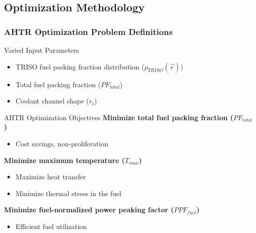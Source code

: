 \subsection{Optimization Methodology}
\begin{frame}
    \frametitle{AHTR Optimization Problem Definitions}
    \begin{block}{Varied Input Parameters}
        \begin{itemize}
            \item TRISO fuel packing fraction distribution ($\rho_{TRISO}(\vec{r})$)
            \item Total fuel packing fraction ($PF_{total}$)
            \item Coolant channel shape ($r_i$)
        \end{itemize}
    \end{block}
    \begin{block}{AHTR Optimization Objectives}
     \textbf{Minimize total fuel packing fraction ($PF_{total}$)}
     \begin{itemize}
        \item Cost savings, non-proliferation 
     \end{itemize}
     \textbf{Minimize maximum temperature ($T_{max}$)}
     \begin{itemize}
        \item Maximize heat transfer 
        \item Minimize thermal stress in the fuel 
     \end{itemize}
     \textbf{Minimize fuel-normalized power peaking factor ($PPF_{fuel}$)} 
     \begin{itemize}
        \item Efficient fuel utilization
     \end{itemize}
    \end{block}
\end{frame}

